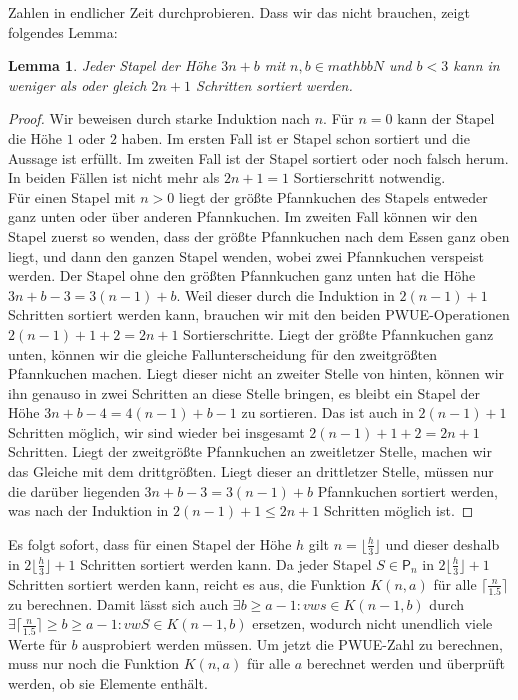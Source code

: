 \documentclass[a4paper,10pt,ngerman]{scrartcl}
\newtheorem{lemma}[theorem]{Lemma}
\begin{document}
Zahlen in endlicher Zeit durchprobieren. Dass wir das nicht brauchen, zeigt folgendes Lemma:
\begin{lemma}
  Jeder Stapel der Höhe $3n+b$ mit $n,b\in mathbb{N}$ und $b<3$ kann in weniger als oder gleich $2n+1$ Schritten sortiert werden.
\end{lemma}
\begin{proof}
  Wir beweisen durch starke Induktion nach $n$. Für $n=0$ kann der Stapel die Höhe $1$ oder $2$ haben. Im ersten Fall ist er Stapel schon sortiert
  und die Aussage ist erfüllt. Im zweiten Fall ist der Stapel sortiert oder noch falsch herum. In beiden Fällen ist nicht mehr als $2n+1=1$ Sortierschritt
  notwendig. \\Für einen Stapel mit $n>0$ liegt der größte Pfannkuchen des Stapels entweder ganz unten oder über anderen Pfannkuchen. Im zweiten Fall können wir
  den Stapel zuerst so wenden, dass der größte Pfannkuchen nach dem Essen ganz oben liegt, und dann den ganzen Stapel wenden, wobei zwei Pfannkuchen verspeist werden.
  Der Stapel ohne den größten Pfannkuchen ganz unten hat die Höhe $3n+b-3=3(n-1)+b$. Weil dieser durch die Induktion in $2(n-1)+1$ Schritten sortiert werden kann,
  brauchen wir mit den beiden PWUE-Operationen $2(n-1)+1+2=2n+1$ Sortierschritte. Liegt der größte Pfannkuchen ganz unten, können wir die gleiche Fallunterscheidung für den
  zweitgrößten Pfannkuchen machen. Liegt dieser nicht an zweiter Stelle von hinten, können wir ihn genauso in zwei Schritten an diese Stelle bringen, es bleibt ein Stapel
  der Höhe $3n+b-4=4(n-1)+b-1$ zu sortieren. Das ist auch in $2(n-1)+1$ Schritten möglich, wir sind wieder bei insgesamt $2(n-1)+1+2=2n+1$ Schritten. Liegt der zweitgrößte
  Pfannkuchen an zweitletzer Stelle, machen wir das Gleiche mit dem drittgrößten. Liegt dieser an drittletzer Stelle, müssen nur die darüber liegenden $3n+b-3=3(n-1)+b$ Pfannkuchen
  sortiert werden, was nach der Induktion in $2(n-1)+1\leq 2n+1$ Schritten möglich ist.
\end{proof}
Es folgt sofort, dass für einen Stapel der Höhe $h$ gilt $n=\lfloor\frac{h}{3}\rfloor$ und dieser deshalb in $2\lfloor\frac{h}{3}\rfloor+1$ Schritten sortiert werden kann.
Da jeder Stapel $S \in \mathsf{P}_n$ in $2\lfloor\frac{h}{3}\rfloor+1$ Schritten sortiert werden kann, reicht es aus, 
die Funktion $K(n,a)$ für alle $\lceil \frac{n}{1.5}\rceil$ zu berechnen.
Damit lässt sich auch $\exists b \geq a-1: vws \in K(n-1,b)$ durch $\exists \lceil \frac{n}{1.5}\rceil \geq b \geq a-1: vwS \in K(n-1,b)$ 
ersetzen, wodurch nicht unendlich viele Werte für $b$
ausprobiert werden müssen.
Um jetzt die PWUE-Zahl zu berechnen, muss nur noch die Funktion $K(n,a)$ für alle $a$ berechnet werden und überprüft werden, ob sie Elemente enthält.
\end{document}
